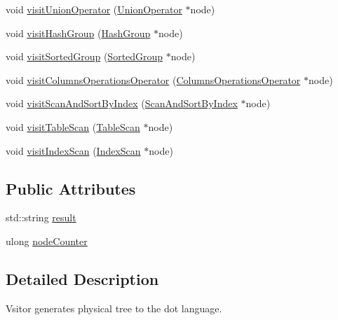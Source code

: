 \begin{DoxyCompactItemize}
\item 
void \hyperlink{classrafe_1_1_physical_operator_drawing_visitor_a9d9921709b02d719159ea0990f041ddd}{visit\+Union\+Operator} (\hyperlink{classrafe_1_1_union_operator}{Union\+Operator} $\ast$node)
\item 
void \hyperlink{classrafe_1_1_physical_operator_drawing_visitor_a81ede5f72bee22e9885236c8056a4556}{visit\+Hash\+Group} (\hyperlink{classrafe_1_1_hash_group}{Hash\+Group} $\ast$node)
\item 
void \hyperlink{classrafe_1_1_physical_operator_drawing_visitor_a5df8d5fca216ef12f6d9b836a310797f}{visit\+Sorted\+Group} (\hyperlink{classrafe_1_1_sorted_group}{Sorted\+Group} $\ast$node)
\item 
void \hyperlink{classrafe_1_1_physical_operator_drawing_visitor_a9c12b247be5746314eb74747bc5d50af}{visit\+Columns\+Operations\+Operator} (\hyperlink{classrafe_1_1_columns_operations_operator}{Columns\+Operations\+Operator} $\ast$node)
\item 
void \hyperlink{classrafe_1_1_physical_operator_drawing_visitor_abd677a519edaf4df41a7a32c7e0fd0cf}{visit\+Scan\+And\+Sort\+By\+Index} (\hyperlink{classrafe_1_1_scan_and_sort_by_index}{Scan\+And\+Sort\+By\+Index} $\ast$node)
\item 
void \hyperlink{classrafe_1_1_physical_operator_drawing_visitor_a0c61159c63401e8a96645a277459650e}{visit\+Table\+Scan} (\hyperlink{classrafe_1_1_table_scan}{Table\+Scan} $\ast$node)
\item 
void \hyperlink{classrafe_1_1_physical_operator_drawing_visitor_a6a74e5a271b3ab7ed954a2821f7dbcc9}{visit\+Index\+Scan} (\hyperlink{classrafe_1_1_index_scan}{Index\+Scan} $\ast$node)
\end{DoxyCompactItemize}
\subsection*{Public Attributes}
\begin{DoxyCompactItemize}
\item 
std\+::string \hyperlink{classrafe_1_1_physical_operator_drawing_visitor_a1e0b2d80743e6a11b4a75af0f68157d8}{result}
\item 
ulong \hyperlink{classrafe_1_1_physical_operator_drawing_visitor_a657ec262f628b93a56bb9ed016d02568}{node\+Counter}
\end{DoxyCompactItemize}


\subsection{Detailed Description}
Vsitor generates physical tree to the dot language. 

